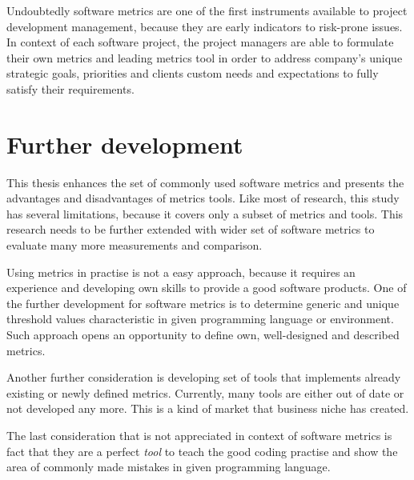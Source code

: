 Undoubtedly software metrics are one of the first instruments available to project development management, because they are early indicators to risk-prone issues. In context of each software project, the project managers are able to formulate their own metrics and leading metrics tool in order to address company's unique strategic goals, priorities and clients custom needs and expectations to fully satisfy their requirements. 

\section{Further development}
This thesis enhances the set of commonly used software metrics and presents the advantages and disadvantages of metrics tools. Like most of research, this study has several limitations, because it covers only a subset of metrics and tools. This research needs to be further extended with wider set of software metrics to evaluate many more measurements and comparison.

Using metrics in practise is not a easy approach, because it requires an experience and developing own skills to provide a good software products. One of the further development for software metrics  is to determine generic and unique threshold values characteristic in given programming language or environment. Such approach opens an opportunity to define own, well-designed and described metrics.

Another further consideration is developing set of tools that implements already existing or newly defined metrics. Currently, many tools are either out of date or not developed any more. This is a kind of market that business niche has created.   

The last consideration that is not appreciated in context of software metrics is fact that they are a perfect \textit{tool} to teach the good coding practise and show the area of commonly made mistakes in given programming language.